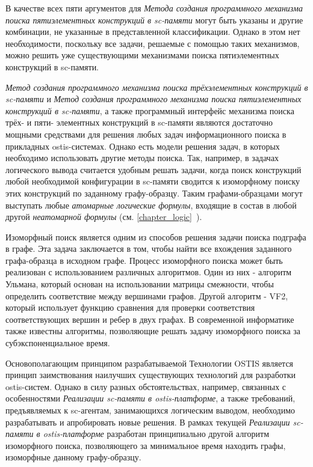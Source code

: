 В качестве всех пяти аргументов для \textit{Метода создания программного механизма поиска пятиэлементных конструкций в sc-памяти} могут быть указаны и другие комбинации, не указанные в представленной классификации. Однако в этом нет необходимости, поскольку все задачи, решаемые с помощью таких механизмов, можно решить уже существующими механизмами поиска пятиэлементных конструкций в sc-памяти.

\textit{Метод создания программного механизма поиска трёхэлементных конструкций в sc-памяти} и \textit{Метод создания программного механизма поиска пятиэлементных конструкций в sc-памяти}, а также программный интерфейс механизма поиска трёх- и пяти- элементных конструкций в sc-памяти являются достаточно мощными средствами для решения любых задач информационного поиска в прикладных ostis-системах. Однако есть модели решения задач, в которых необходимо использовать другие методы поиска. Так, например, в задачах логического вывода считается удобным решать задачи, когда поиск конструкций любой необходимой конфигурации в sc-памяти сводится к изоморфному поиску этих конструкций по заданному графу-образцу. Таким графами-образцами могут выступать любые \textit{атомарные логические формулы}, входящие в состав в любой другой \textit{неатомарной формулы} (см. \ref{chapter_logic}~).

Изоморфный поиск является одним из способов решения задачи поиска подграфа в графе. Эта задача заключается в том, чтобы найти все вхождения заданного графа-образца в исходном графе. Процесс изоморфного поиска может быть реализован с использованием различных алгоритмов. Один из них - алгоритм Ульмана, который основан на использовании матрицы смежности, чтобы определить соответствие между вершинами графов. Другой алгоритм - VF2, который использует функцию сравнения для проверки соответствия соответствующих вершин и ребер в двух графах. В современной информатике также известны алгоритмы, позволяющие решать задачу изоморфного поиска за субэкспоненциальное время.

Основополагающим принципом разрабатываемой Технологии OSTIS является принцип заимствования наилучших существующих технологий для разработки ostis-систем. Однако в силу разных обстоятельствах, например, связанных с особенностями \textit{Реализации sc-памяти в ostis-платформе}, а также требований, предъявляемых к sc-агентам, занимающихся логическим выводом, необходимо разрабатывать и апробировать новые решения. В рамках текущей \textit{Реализации sc-памяти в ostis-платформе} разработан принципиально другой алгоритм изоморфного поиска, позволяющего за минимальное время находить графы, изоморфные данному графу-образцу.

